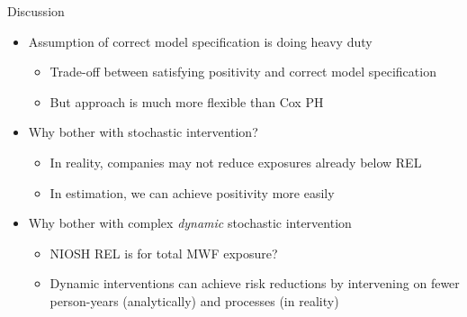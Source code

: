 \documentclass[
  11pt,
  ignorenonframetext,
]{beamer}
\providecommand{\tightlist}{%
  \setlength{\itemsep}{0pt}\setlength{\parskip}{0pt}}
\begin{document}
\begin{frame}{Discussion}
\protect\hypertarget{discussion}{}
\begin{itemize}
\tightlist
\item
  Assumption of correct model specification is doing heavy duty

  \begin{itemize}
  \tightlist
  \item
    Trade-off between satisfying positivity and correct model
    specification
  \item
    But approach is much more flexible than Cox PH
  \end{itemize}
\item
  Why bother with stochastic intervention?

  \begin{itemize}
  \tightlist
  \item
    In reality, companies may not reduce exposures already below REL
  \item
    In estimation, we can achieve positivity more easily
  \end{itemize}
\item
  Why bother with complex \emph{dynamic} stochastic intervention

  \begin{itemize}
  \tightlist
  \item
    NIOSH REL is for total MWF exposure?
  \item
    Dynamic interventions can achieve risk reductions by intervening on
    fewer person-years (analytically) and processes (in reality)
  \end{itemize}
\end{itemize}
\end{frame}
\end{document}
